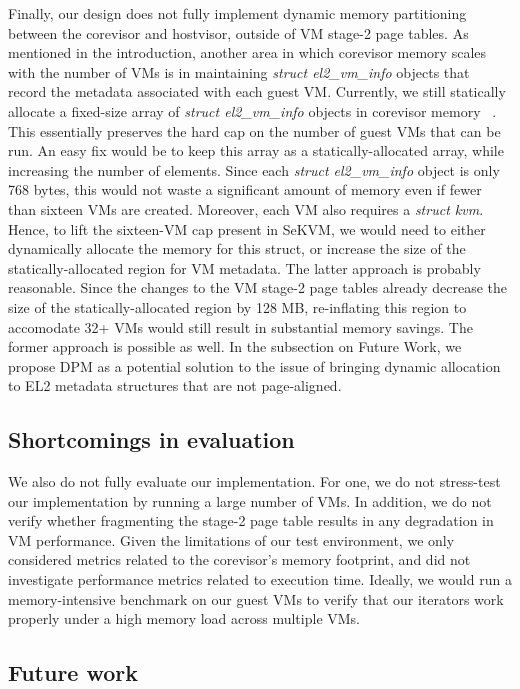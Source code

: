 Finally, our design does not fully implement
dynamic memory partitioning between the corevisor and hostvisor, outside of VM stage-2 page tables. As mentioned in
the introduction, another area in which corevisor memory scales with the number
of VMs is in maintaining \textit{struct el2\_vm\_info} objects that record the
metadata associated with each guest VM. Currently, we still statically allocate
a fixed-size array of \textit{struct el2\_vm\_info} objects in corevisor
memory ~\cite{hypsec_host.h}. This essentially preserves the hard cap on the
number of guest VMs that can be run. An easy fix would be to keep this array
as a statically-allocated array, while increasing the number of elements. Since each
\textit{struct el2\_vm\_info} object is only 768 bytes, this would not waste a
significant amount of memory even if fewer than sixteen VMs are created. Moreover,
each VM also requires a \textit{struct kvm}. Hence, to lift the sixteen-VM cap present
in SeKVM, we would need to either dynamically allocate the memory for this struct,
or increase the size of the statically-allocated region for VM metadata.
The latter approach is probably reasonable.
Since the changes to the VM stage-2 page tables already decrease the size
of the statically-allocated region by 128 MB, re-inflating this region to accomodate 32+ VMs would still result in substantial memory savings. 
The former approach is possible as well. In the subsection on Future Work, we propose DPM as a potential solution to
the issue of bringing dynamic allocation to EL2 metadata structures that are not page-aligned.

\subsection{Shortcomings in evaluation}

We also do not fully evaluate our implementation. For one, we do not stress-test our implementation by running a large number
of VMs. In addition, we do not verify whether fragmenting the stage-2 page table results
in any degradation in VM performance. Given the limitations of our test environment, we
only considered metrics related to the corevisor's memory footprint, and did not investigate performance metrics related to execution time. Ideally, we would run a memory-intensive
benchmark on our guest VMs to verify that our iterators work properly under a
high memory load across multiple VMs.

\subsection{Future work}

